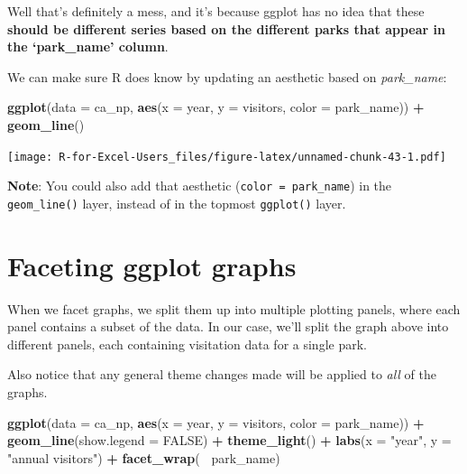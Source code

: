 \documentclass[]{book}
\newenvironment{Shaded}{\begin{snugshade}}{\end{snugshade}}
\newcommand{\DataTypeTok}[1]{\textcolor[rgb]{0.13,0.29,0.53}{#1}}
\newcommand{\KeywordTok}[1]{\textcolor[rgb]{0.13,0.29,0.53}{\textbf{#1}}}
\newcommand{\NormalTok}[1]{#1}
\newcommand{\OperatorTok}[1]{\textcolor[rgb]{0.81,0.36,0.00}{\textbf{#1}}}
\newcommand{\OtherTok}[1]{\textcolor[rgb]{0.56,0.35,0.01}{#1}}
\newcommand{\StringTok}[1]{\textcolor[rgb]{0.31,0.60,0.02}{#1}}
\begin{document}
Well that's definitely a mess, and it's because ggplot has no idea that these \textbf{should be different series based on the different parks that appear in the `park\_name' column}.

We can make sure R does know by updating an aesthetic based on \emph{park\_name}:

\begin{Shaded}
\begin{Highlighting}[]
\KeywordTok{ggplot}\NormalTok{(}\DataTypeTok{data =}\NormalTok{ ca_np, }\KeywordTok{aes}\NormalTok{(}\DataTypeTok{x =}\NormalTok{ year, }\DataTypeTok{y =}\NormalTok{ visitors, }\DataTypeTok{color =}\NormalTok{ park_name)) }\OperatorTok{+}
\StringTok{  }\KeywordTok{geom_line}\NormalTok{()}
\end{Highlighting}
\end{Shaded}

\texttt{[image: R-for-Excel-Users\_files/figure-latex/unnamed-chunk-43-1.pdf]}

\textbf{Note}: You could also add that aesthetic (\texttt{color\ =\ park\_name}) in the \texttt{geom\_line()} layer, instead of in the topmost \texttt{ggplot()} layer.

\hypertarget{faceting-ggplot-graphs}{%
\section{Faceting ggplot graphs}\label{faceting-ggplot-graphs}}

When we facet graphs, we split them up into multiple plotting panels, where each panel contains a subset of the data. In our case, we'll split the graph above into different panels, each containing visitation data for a single park.

Also notice that any general theme changes made will be applied to \emph{all} of the graphs.

\begin{Shaded}
\begin{Highlighting}[]
\KeywordTok{ggplot}\NormalTok{(}\DataTypeTok{data =}\NormalTok{ ca_np, }\KeywordTok{aes}\NormalTok{(}\DataTypeTok{x =}\NormalTok{ year, }\DataTypeTok{y =}\NormalTok{ visitors, }\DataTypeTok{color =}\NormalTok{ park_name)) }\OperatorTok{+}
\StringTok{  }\KeywordTok{geom_line}\NormalTok{(}\DataTypeTok{show.legend =} \OtherTok{FALSE}\NormalTok{) }\OperatorTok{+}
\StringTok{  }\KeywordTok{theme_light}\NormalTok{() }\OperatorTok{+}\StringTok{ }
\StringTok{  }\KeywordTok{labs}\NormalTok{(}\DataTypeTok{x =} \StringTok{"year"}\NormalTok{, }\DataTypeTok{y =} \StringTok{"annual visitors"}\NormalTok{) }\OperatorTok{+}
\StringTok{  }\KeywordTok{facet_wrap}\NormalTok{(}\OperatorTok{~}\StringTok{ }\NormalTok{park_name)}
\end{Highlighting}
\end{Shaded}
\end{document}
